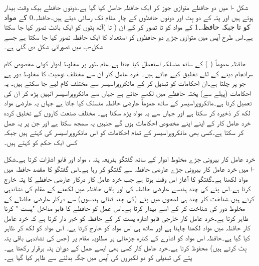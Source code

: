 شکل -ا میں دو   حافظے متوازی جوڑ کر ایک  حافظہ حاصل کیا گیا ہے۔دونوں حافظے بیک وقت بیدار ہوتے ہیں اور پتہ کے دو بِٹ   اور   دونوں حافظوں  کے چار مقام تک رسائی  دیتے ہیں۔حافظہ۔0 کے مواد کو  تا    جبکہ حافظہ۔1 کے مواد کو  تا  تصور کر   کے 
ان  ( تا )آٹھ بِٹوں کو ایک بائٹ تصور کیا جا سکتا ہے۔اس طرح آپس میں  متوازی   جڑے دو  حافظوں کو   استعداد کا  ایک حافظہ تصور کیا جا سکتا ہے جسے شکل-ب میں تصوراتی شکل دی گئی ہے۔ 

حافظہ عموماً  (   ) کے ساتھ منسلکہ استعمال کیا جاتا ہے۔عام طور پر مخلوط ادوار  کوئی  مخصوص کام  سرانجام دینے  کے لئے  تخلیق کیے جاتے ہیں۔ خرد عامل کار ان سے مختلف نوعیت کا مخلوط دور ہے جو  پر چلتا ہے۔ان احکامات کو تبدیل کر کے  مائکروپراسیسر  سے مختلف کام لیے جا سکتے ہیں۔  یہ  احکامات (پہلے سے)   پختہ حافظے میں لکھے جاتے ہے جہاں سے مائکروپراسیسر انہیں پڑھ کر ان کی تعمیل کرتا ہے۔مائکروپراسیسر کے ساتھ عموماً عارضی حافظہ  منسلک کیا جاتا ہے جہاں یہ عارضی مواد لکھ کر ذخیرہ  کر سکتا ہے اور جہاں سے یہ      مواد پڑھ  سکتا ہے۔ مختلف صنعت کاروں کے   تخلیق کردہ   خرد عامل کار  کے  اپنے اپنے مخصوص احکامات ہوں گے جنہیں یہ  سمجھ سکتا ہے اور جن پر  یہ  عمل کر سکتا ہے۔کسی بھی مائکروپراسیسر کے تمام احکامات کو اس مائکروپراسیسر کی   کہتے ہیں جبکہ کسی ایک  حکم  کو  کہتے ہیں۔


خرد عامل کار بیرونی جڑے مخلوط ادوار کے ساتھ گفتگو بذریعہ پتہ ، مواد اور قابو اشارات  کرتا ہے۔شکل -ا میں خرد عامل کار بیرونی جڑے عارضی حافظہ سے گفتگو کر رہا ہے۔اس گفتگو کا مقصد حافظہ میں مواد لکھنا ہے۔گفتگو کا آغاز اس وقت ہوتا ہے جب  خرد عامل کار درکار عارضی حافظے کا پتہ خارج کرتا ہے۔اس پتے کی چند ہندسے عارضی حافظہ کی   اور باقی حافظہ میں لکھنے کے مقام کی نشاندہی کرتے ہیں۔شناخت کار چند ہی لمحوں میں پتے  (کی چند ثنائی ہندسوں)  سے درکار عارضی  حافظے   کے مخلوط دور کی شناخت کر کے اسے بیدار کرتا ہے۔اس عمل    کو حافظے کا قابو مداخل  "پست  " کرنا ظاہر کرتا   ہے۔خرد عامل کار خارجی قابو اشارہ    پست کر کے حافظہ کو خبر دار کرتا ہے کہ خرد عامل کار حافظہ میں مواد لکھنا چاہتا ہے اور ساتھ ہی اس مواد   کو  خارج کرتا ہے۔ اس مواد کو  لکھ کر ظاہر کیا گیا ہے۔حافظہ اس مواد کو     اشارے کے کنارہ چڑھائی پر مطلوبہ مقام پر (جس کی نشاندہی باقی پتہ بِٹ کرتے ہیں)  محفوظ کرتا ہے۔خرد عامل کار کسی بھی ایسے  عمل کے دوران  پتہ برقرار رکھتا ہے۔ پتے کی تبدیلی کو دو لکیروں کی آپس میں جگہ بدلنے سے ظاہر کیا  گیا ہے۔

